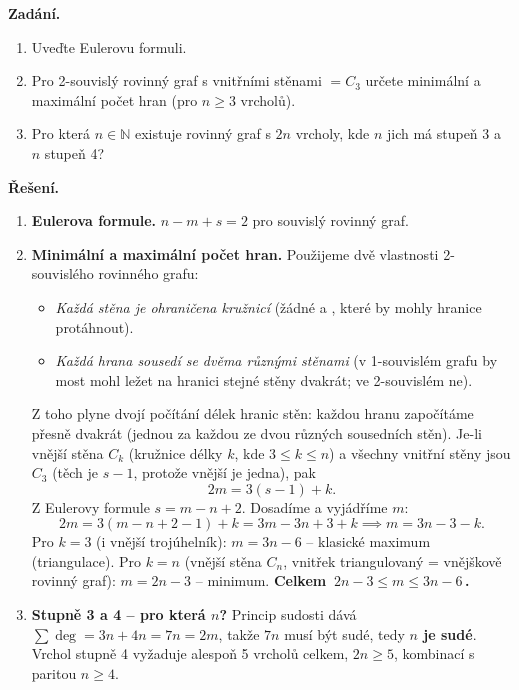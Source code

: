 \documentclass[11pt,a4paper]{article}
\begin{document}
\begin{priklad} \par
\textbf{Zadání.}
\begin{enumerate}[label=(\arabic*)]
  \item Uveďte Eulerovu formuli.
  \item Pro 2-souvislý rovinný graf s vnitřními stěnami $=C_3$ určete minimální a maximální počet hran (pro $n\ge 3$ vrcholů).
  \item Pro která $n\in\mathbb{N}$ existuje rovinný graf s $2n$ vrcholy, kde $n$ jich má stupeň 3 a $n$ stupeň 4?
\end{enumerate}

\textbf{Řešení.}
\begin{enumerate}[label=(\arabic*)]
  \item \textbf{Eulerova formule.} $n-m+s=2$ pro souvislý rovinný graf.
  \item \textbf{Minimální a maximální počet hran.} Použijeme dvě vlastnosti 2-souvislého rovinného grafu:
  \begin{itemize}
    \item \emph{Každá stěna je ohraničena kružnicí} (žádné  a , které by mohly hranice protáhnout).
    \item \emph{Každá hrana sousedí se dvěma různými stěnami} (v 1-souvislém grafu by most mohl ležet na hranici stejné stěny dvakrát; ve 2-souvislém ne).
  \end{itemize}
  Z toho plyne dvojí počítání délek hranic stěn: každou hranu započítáme přesně dvakrát (jednou za každou ze dvou různých sousedních stěn). Je-li vnější stěna $C_k$ (kružnice délky $k$, kde $3\le k\le n$) a všechny vnitřní stěny jsou $C_3$ (těch je $s-1$, protože vnější je jedna), pak
  \[ 2m=3(s-1)+k. \]
  Z Eulerovy formule $s=m-n+2$. Dosadíme a vyjádříme $m$:
  \[ 2m=3(m-n+2-1)+k=3m-3n+3+k\implies m=3n-3-k. \]
  Pro $k=3$ (i vnější trojúhelník): $m=3n-6$ -- klasické maximum (triangulace). Pro $k=n$ (vnější stěna $C_n$, vnitřek triangulovaný = vnějškově rovinný graf): $m=2n-3$ -- minimum.
  \textbf{Celkem $\boxed{\,2n-3\le m\le 3n-6\,}$.}
  \item \textbf{Stupně 3 a 4 -- pro která $n$?} Princip sudosti dává $\sum\deg=3n+4n=7n=2m$, takže $7n$ musí být sudé, tedy \textbf{$n$ je sudé}. Vrchol stupně 4 vyžaduje alespoň 5 vrcholů celkem, $2n\ge 5$, kombinací s paritou $n\ge 4$.


\end{enumerate}
\end{priklad}
\end{document}
